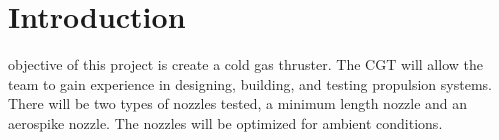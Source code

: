 \documentclass[conference]{IEEEtran} %
\begin{document}
\label{sec:nomenclature}
\newcommand{\nomunit}[1]{%
\renewcommand{\nomentryend}{\hspace*{\fill}#1}}
\renewcommand{\nompreamble}{

  }
\printnomenclature{}



\section{Introduction}
\label{sec:introduction}

 objective of this project is create a cold gas thruster. The CGT will allow the team to gain experience in designing, building, and testing propulsion systems.
There will be two types of nozzles tested, a minimum length nozzle and an aerospike nozzle. The nozzles will be optimized for ambient conditions.
\end{document}
